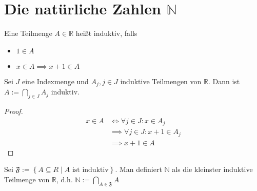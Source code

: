 \chapter{Die natürliche Zahlen $\mathbb{N}$}
\begin{definition}\label{Ana1:N:Induktiv}
  Eine Teilmenge $A \in \mathbb{R}$ heißt induktiv, falls
  \begin{itemize}
  \item $1 \in A$
  \item $x \in A \implies x+1 \in A$
  \end{itemize}
\end{definition}
\begin{observation}
  Sei $J$ eine Indexmenge und $A_j, j \in J$ induktive Teilmengen von $\mathbb{R}$. Dann ist $A := \bigcap_{j \in J} A_j$ induktiv.
  \begin{proof}
    \begin{align*}
      x \in A &\iff \forall j \in J: x \in A_j \\
      \,&\implies \forall j \in J: x+1 \in A_j \\
      \,&\implies x+1 \in A
    \end{align*}
  \end{proof}
\end{observation}
\begin{definition}\label{Ana1:N}
  Sei $\mathfrak{F} := \left\{ A \subseteq R \middle| A \text{ ist induktiv} \right\}$. Man definiert $\mathbb{N}$ als die kleinster induktive Teilmenge von $\mathbb{R}$, d.h. $\mathbb{N} := \bigcap_{A \in \mathfrak{F}} A$
\end{definition}

